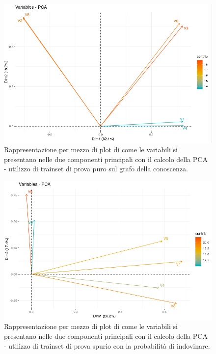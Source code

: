 \begin{figure}[H]
\centering
	\includegraphics[width=0.80\linewidth]{../../PCA/plot/PCA.png}
	\caption{Rappresentazione per mezzo di plot di come le variabili si presentano nelle due componenti principali con il calcolo della PCA - utilizzo di trainset di prova puro sul grafo della conoscenza.}
\end{figure}
\begin{figure}[H]
\centering
	\includegraphics[width=0.80\linewidth]{../../PCA/plot/PCA-valorindovinati.png}
	\caption{Rappresentazione per mezzo di plot di come le variabili si presentano nelle due componenti principali con il calcolo della PCA - utilizzo di trainset di prova spurio con la probabilit\`a di indovinare.}
\end{figure}